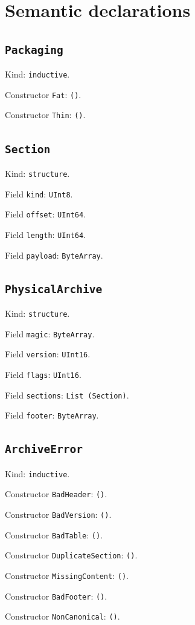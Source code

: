 \documentclass[11pt]{article}
\begin{document}
\section*{Semantic declarations}
\subsection*{\texttt{Packaging}}
\noindent Kind: \texttt{inductive}.\par
\noindent Constructor \texttt{Fat}: \texttt{()}.\par
\noindent Constructor \texttt{Thin}: \texttt{()}.\par
\subsection*{\texttt{Section}}
\noindent Kind: \texttt{structure}.\par
\noindent Field \texttt{kind}: \texttt{UInt8}.\par
\noindent Field \texttt{offset}: \texttt{UInt64}.\par
\noindent Field \texttt{length}: \texttt{UInt64}.\par
\noindent Field \texttt{payload}: \texttt{ByteArray}.\par
\subsection*{\texttt{PhysicalArchive}}
\noindent Kind: \texttt{structure}.\par
\noindent Field \texttt{magic}: \texttt{ByteArray}.\par
\noindent Field \texttt{version}: \texttt{UInt16}.\par
\noindent Field \texttt{flags}: \texttt{UInt16}.\par
\noindent Field \texttt{sections}: \texttt{List (Section)}.\par
\noindent Field \texttt{footer}: \texttt{ByteArray}.\par
\subsection*{\texttt{ArchiveError}}
\noindent Kind: \texttt{inductive}.\par
\noindent Constructor \texttt{BadHeader}: \texttt{()}.\par
\noindent Constructor \texttt{BadVersion}: \texttt{()}.\par
\noindent Constructor \texttt{BadTable}: \texttt{()}.\par
\noindent Constructor \texttt{DuplicateSection}: \texttt{()}.\par
\noindent Constructor \texttt{MissingContent}: \texttt{()}.\par
\noindent Constructor \texttt{BadFooter}: \texttt{()}.\par
\noindent Constructor \texttt{NonCanonical}: \texttt{()}.\par
\end{document}
